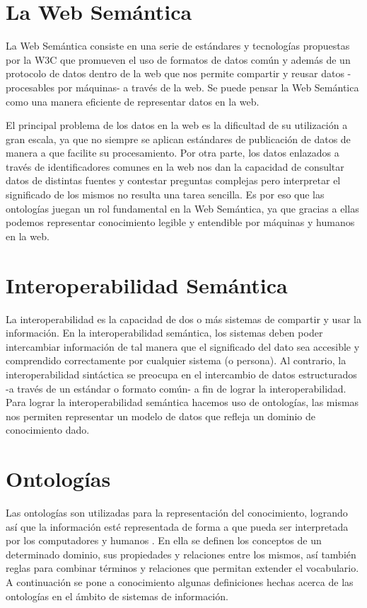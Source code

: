 \section{La Web Semántica}
La Web Semántica consiste en una serie de estándares y tecnologías propuestas por la W3C\cite{Semantic20:online} que promueven el uso de formatos de datos común y además de un protocolo de datos dentro de la web que nos permite compartir y reusar datos -procesables por máquinas- a través de la web. Se puede pensar la Web Semántica como una manera eficiente de representar datos en la web.\cite{TimBernersLeee}\cite{Shadbolt:2006}

El principal problema de los datos en la web es la dificultad de su utilización a gran escala, ya que no siempre se aplican estándares de publicación de datos de manera a que facilite su procesamiento. Por otra parte, los datos enlazados a través de identificadores comunes en la web nos dan la capacidad de consultar datos de distintas fuentes y contestar preguntas complejas pero interpretar el significado de los mismos no resulta una tarea sencilla. Es por eso que las ontologías juegan un rol fundamental en la Web Semántica, ya que gracias a ellas podemos representar conocimiento legible y entendible por máquinas y humanos en la web.

\section{Interoperabilidad Semántica}
\label{section:interoperabilidadsemantica}
La interoperabilidad es la capacidad de dos o más sistemas de compartir y usar la  información. En la interoperabilidad semántica, los sistemas deben poder intercambiar información de tal manera que el significado del dato sea accesible y comprendido correctamente por cualquier sistema (o persona)\cite{Interoperability}\cite{Schulz2013HowOC}. Al contrario, la interoperabilidad sintáctica se preocupa en el intercambio de datos estructurados -a través de un estándar o formato común- a fin de lograr la interoperabilidad.
Para lograr la interoperabilidad semántica hacemos uso de ontologías, las mismas nos permiten representar un modelo de datos que refleja un dominio de conocimiento dado.

\section{Ontologías}
Las ontologías son utilizadas para la representación del conocimiento, logrando así que la información esté representada de forma a que pueda ser interpretada por los computadores y humanos \cite{horrocks2011kr}. En ella se definen los conceptos de un determinado dominio, sus propiedades y relaciones entre los mismos, así también reglas para combinar términos y relaciones que permitan extender el vocabulario.
A continuación se pone a conocimiento algunas definiciones hechas acerca de las ontologías en el ámbito de sistemas de información.

